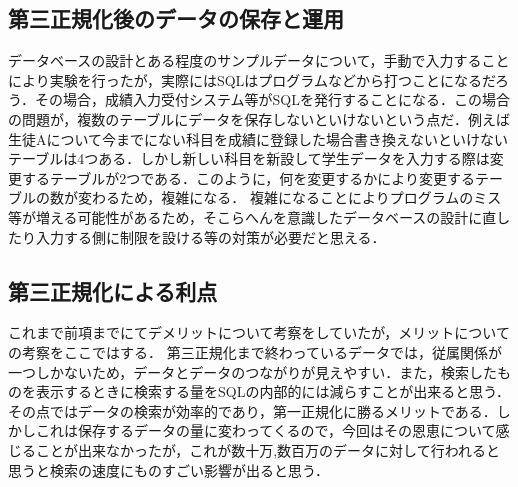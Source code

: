 \documentclass[a4paper,11pt]{ltjsarticle}
\begin{document}
\subsection{第三正規化後のデータの保存と運用}
データベースの設計とある程度のサンプルデータについて，手動で入力することにより実験を行ったが，実際にはSQLはプログラムなどから打つことになるだろう．その場合，成績入力受付システム等がSQLを発行することになる．この場合の問題が，複数のテーブルにデータを保存しないといけないという点だ．例えば生徒Aについて今までにない科目を成績に登録した場合書き換えないといけないテーブルは4つある．しかし新しい科目を新設して学生データを入力する際は変更するテーブルが2つである．このように，何を変更するかにより変更するテーブルの数が変わるため，複雑になる．
複雑になることによりプログラムのミス等が増える可能性があるため，そこらへんを意識したデータベースの設計に直したり入力する側に制限を設ける等の対策が必要だと思える．
\subsection{第三正規化による利点}
これまで前項までにてデメリットについて考察をしていたが，メリットについての考察をここではする．
第三正規化まで終わっているデータでは，従属関係が一つしかないため，データとデータのつながりが見えやすい．また，検索したものを表示するときに検索する量をSQLの内部的には減らすことが出来ると思う．その点ではデータの検索が効率的であり，第一正規化に勝るメリットである．しかしこれは保存するデータの量に変わってくるので，今回はその恩恵について感じることが出来なかったが，これが数十万,数百万のデータに対して行われると思うと検索の速度にものすごい影響が出ると思う．
\end{document}
